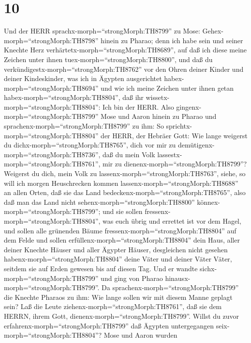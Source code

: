 \hypertarget{section-9}{%
\section{10}\label{section-9}}

 Und der HERR sprachx-morph=``strongMorph:TH8799'' zu Mose:
Gehex-morph=``strongMorph:TH8798'' hinein zu Pharao; denn ich habe sein
und seiner Knechte Herz verhärtetx-morph=``strongMorph:TH8689'', auf daß
ich diese meine Zeichen unter ihnen tuex-morph=``strongMorph:TH8800'',
 und daß du verkündigestx-morph=``strongMorph:TH8762'' vor
den Ohren deiner Kinder und deiner Kindeskinder, was ich in Ägypten
ausgerichtet habex-morph=``strongMorph:TH8694'' und wie ich meine
Zeichen unter ihnen getan habex-morph=``strongMorph:TH8804'', daß ihr
wissetx-morph=``strongMorph:TH8804'': Ich bin der HERR. 
Also gingenx-morph=``strongMorph:TH8799'' Mose und Aaron hinein zu
Pharao und sprachenx-morph=``strongMorph:TH8799'' zu ihm: So
sprichtx-morph=``strongMorph:TH8804'' der HERR, der Hebräer Gott: Wie
lange weigerst du dichx-morph=``strongMorph:TH8765'', dich vor mir zu
demütigenx-morph=``strongMorph:TH8736'', daß du mein Volk
lassestx-morph=``strongMorph:TH8761'', mir zu
dienenx-morph=``strongMorph:TH8799''?  Weigerst du dich,
mein Volk zu lassenx-morph=``strongMorph:TH8763'', siehe, so will ich
morgen Heuschrecken kommen lassenx-morph=``strongMorph:TH8688'' an allen
Orten,  daß sie das Land
bedeckenx-morph=``strongMorph:TH8765'', also daß man das Land nicht
sehenx-morph=``strongMorph:TH8800'' könnex-morph=``strongMorph:TH8799'';
und sie sollen fressenx-morph=``strongMorph:TH8804'', was euch übrig und
errettet ist vor dem Hagel, und sollen alle grünenden Bäume
fressenx-morph=``strongMorph:TH8804'' auf dem Felde  und
sollen erfüllenx-morph=``strongMorph:TH8804'' dein Haus, aller deiner
Knechte Häuser und aller Ägypter Häuser, desgleichen nicht gesehen
habenx-morph=``strongMorph:TH8804'' deine Väter und deiner Väter Väter,
seitdem sie auf Erden gewesen bis auf diesen Tag. Und er wandte
sichx-morph=``strongMorph:TH8799'' und ging von Pharao
hinausx-morph=``strongMorph:TH8799''.  Da
sprachenx-morph=``strongMorph:TH8799'' die Knechte Pharaos zu ihm: Wie
lange sollen wir mit diesem Manne geplagt sein? Laß die Leute
ziehenx-morph=``strongMorph:TH8761'', daß sie dem HERRN, ihrem Gott,
dienenx-morph=``strongMorph:TH8799''. Willst du zuvor
erfahrenx-morph=``strongMorph:TH8799'' daß Ägypten untergegangen
seix-morph=``strongMorph:TH8804''?  Mose und Aaron wurden
